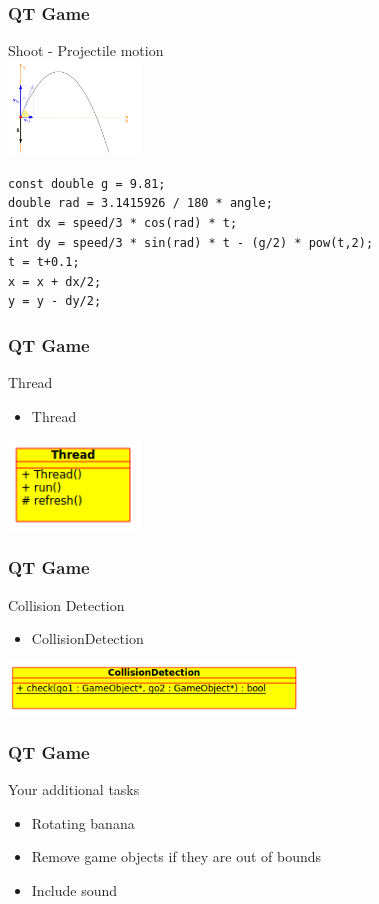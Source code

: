 \begin{frame}[fragile]
\frametitle{QT Game}
Shoot - Projectile motion\\
\includegraphics[width=100pt]{img/pro_motion.png}

{\small
\begin{lstlisting}
const double g = 9.81;
double rad = 3.1415926 / 180 * angle;
int dx = speed/3 * cos(rad) * t;
int dy = speed/3 * sin(rad) * t - (g/2) * pow(t,2);
t = t+0.1;
x = x + dx/2;
y = y - dy/2;
\end{lstlisting}
}
\end{frame}

\begin{frame}[fragile]
\frametitle{QT Game}
Thread
\begin{itemize}
\item Thread
\end{itemize}
\includegraphics[width=100pt]{img/qtgame_cdthread.png}
\end{frame}

\begin{frame}[fragile]
\frametitle{QT Game}
Collision Detection
\begin{itemize}
\item CollisionDetection
\end{itemize}
\includegraphics[width=220pt]{img/qtgame_cdcd.png}
\end{frame}

\begin{frame}[fragile]
\frametitle{QT Game}
Your additional tasks
\begin{itemize}
\item Rotating banana
\item Remove game objects if they are out of bounds
\item Include sound
\end{itemize}
\end{frame}



